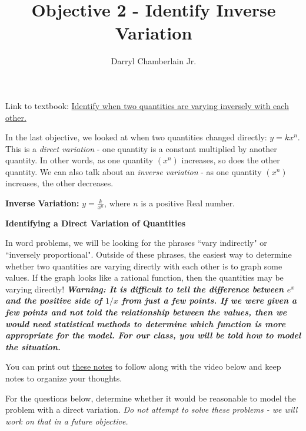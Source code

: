\documentclass{ximera}
\author{Darryl Chamberlain Jr.}
\title{Objective 2 - Identify Inverse Variation}
\begin{document}
\begin{abstract}
		
\end{abstract}
	
\maketitle
	
Link to textbook: 
\href{https://cnx.org/contents/mwjClAV_@8.12:yUH0hROr@12/Modeling-Using-Variation}{Identify when two quantities are varying inversely with each other.}
	
	
In the last objective, we looked at when two quantities changed directly: $y=kx^n$. This is a \textit{direct variation} - one quantity is a constant multiplied by another quantity. In other words, as one quantity $(x^n)$ increases, so does the other quantity. We can also talk about an \textit{inverse variation} - as one quantity $(x^n)$ increases, the other decreases. 
	
\textbf{Inverse Variation:} $y = \frac{k}{x^n}$, where $n$ is a positive Real number. 
	
\textbf{Identifying a Direct Variation of Quantities}
	
In word problems, we will be looking for the phrases ``vary indirectly" or ``inversely proportional". Outside of these phrases, the easiest way to determine whether two quantities are varying directly with each other is to graph some values. If the graph looks like a rational function, then the quantities may be varying directly! \textbf{\textit{Warning: It is difficult to tell the difference between $e^x$ and the positive side of $1/x$ from just a few points. If we were given a few points and not told the relationship between the values, then we would need statistical methods to determine which function is more appropriate for the model. For our class, you will be told how to model the situation.}} 

You can print out \href{http://people.clas.ufl.edu/dchamberlain31/files/M10M-Objective-2-Identify-Inverse-Variation.pdf}{these notes} to follow along with the video below and keep notes to organize your thoughts.

	
For the questions below, determine whether it would be reasonable to model the problem with a direct variation. \textit{Do not attempt to solve these problems - we will work on that in a future objective.}
\end{document}
